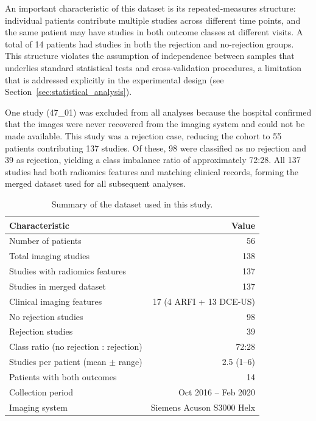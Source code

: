 An important characteristic of this dataset is its repeated-measures structure: individual patients contribute multiple studies across different time points, and the same patient may have studies in both outcome classes at different visits. A total of 14 patients had studies in both the rejection and no-rejection groups. This structure violates the assumption of independence between samples that underlies standard statistical tests and cross-validation procedures, a limitation that is addressed explicitly in the experimental design (see Section~\ref{sec:statistical_analysis}).

One study (47\_01) was excluded from all analyses because the hospital confirmed that the images were never recovered from the imaging system and could not be made available. This study was a rejection case, reducing the cohort to 55 patients contributing 137 studies. Of these, 98 were classified as no rejection and 39 as rejection, yielding a class imbalance ratio of approximately 72:28. All 137 studies had both radiomics features and matching clinical records, forming the merged dataset used for all subsequent analyses.

\begin{table}[ht]
\centering
\caption{Summary of the dataset used in this study.}
\label{tab:dataset_summary}
\begin{tabular}{lr}
\toprule
Characteristic & Value \\
\midrule
Number of patients & 56 \\
Total imaging studies & 138 \\
Studies with radiomics features & 137 \\
Studies in merged dataset & 137 \\
Clinical imaging features & 17 (4 ARFI + 13 DCE-US) \\
No rejection studies & 98 \\
Rejection studies & 39 \\
Class ratio (no rejection : rejection) & 72:28 \\
Studies per patient (mean $\pm$ range) & 2.5 (1--6) \\
Patients with both outcomes & 14 \\
Collection period & Oct 2016 -- Feb 2020 \\
Imaging system & Siemens Acuson S3000 Helx \\
\bottomrule
\end{tabular}
\end{table}


